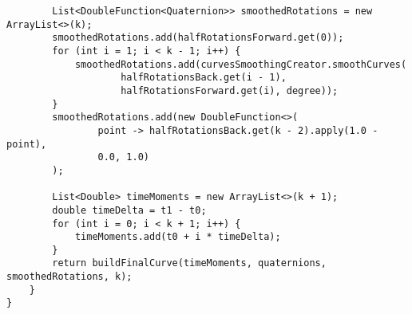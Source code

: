 \begin{verbatim}
        List<DoubleFunction<Quaternion>> smoothedRotations = new ArrayList<>(k);
        smoothedRotations.add(halfRotationsForward.get(0));
        for (int i = 1; i < k - 1; i++) {
            smoothedRotations.add(curvesSmoothingCreator.smoothCurves(
                    halfRotationsBack.get(i - 1),
                    halfRotationsForward.get(i), degree));
        }
        smoothedRotations.add(new DoubleFunction<>(
                point -> halfRotationsBack.get(k - 2).apply(1.0 - point),
                0.0, 1.0)
        );

        List<Double> timeMoments = new ArrayList<>(k + 1);
        double timeDelta = t1 - t0;
        for (int i = 0; i < k + 1; i++) {
            timeMoments.add(t0 + i * timeDelta);
        }
        return buildFinalCurve(timeMoments, quaternions, smoothedRotations, k);
    }
}
\end{verbatim}


